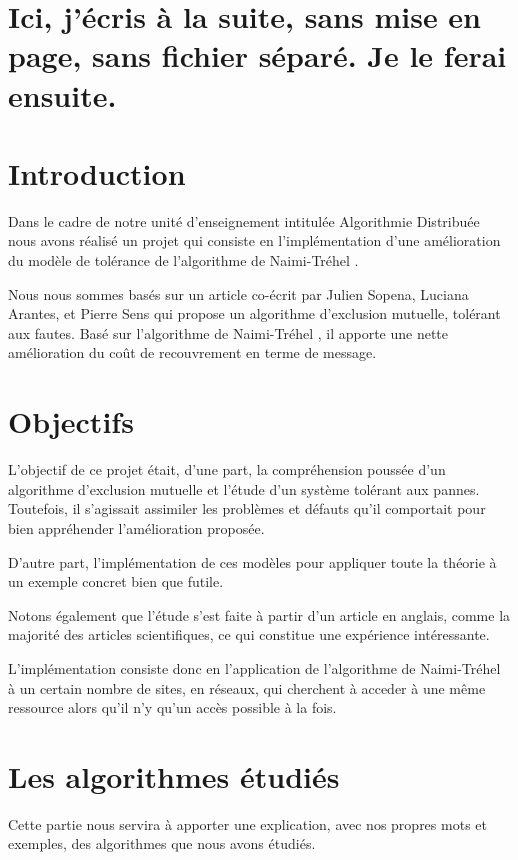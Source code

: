 \documentclass[a4paper,12pt]{article}
\title{\psubject}
\author{Raimana BOUISSOU, Tom GIMENEZ, Léo RIZZON}
\date{}
\newcommand{\nt}{Naimi-Tréhel }
\begin{document}
\maketitle

\section*{Ici, j'écris à la suite, sans mise en page, sans fichier séparé. Je le ferai ensuite.}

\section{Introduction}

Dans le cadre de notre unité d'enseignement intitulée Algorithmie Distribuée nous avons réalisé un projet qui consiste en l'implémentation d'une amélioration du modèle de tolérance de l'algorithme de \nt.

Nous nous sommes basés sur un article co-écrit par Julien Sopena, Luciana Arantes, et Pierre Sens qui propose un algorithme d'exclusion mutuelle, tolérant aux fautes. Basé sur l'algorithme de \nt, il apporte une nette amélioration du coût de recouvrement en terme de message.



\section{Objectifs}

L'objectif de ce projet était, d'une part, la compréhension poussée d'un algorithme d'exclusion mutuelle et l'étude d'un système tolérant aux pannes.  Toutefois, il s'agissait assimiler les problèmes et défauts qu'il comportait pour bien appréhender l'amélioration proposée.

D'autre part, l'implémentation de ces modèles pour appliquer toute la théorie à un exemple concret bien que futile.

Notons également que l'étude s'est faite à partir d'un article en anglais, comme la majorité des articles scientifiques, ce qui constitue une expérience intéressante.

L'implémentation consiste donc en l'application de l'algorithme de Naimi-Tréhel à un certain nombre de sites, en réseaux, qui cherchent à acceder à une même ressource alors qu'il n'y qu'un accès possible à la fois.

\section{Les algorithmes étudiés}
Cette partie nous servira à apporter une explication, avec nos propres mots et exemples, des algorithmes que nous avons étudiés.
\end{document}

